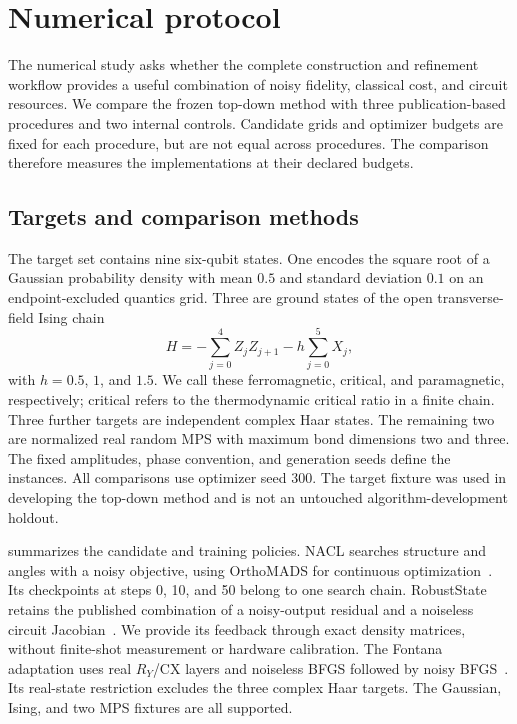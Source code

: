 \section{Numerical protocol}
\label{sec:protocol}

The numerical study asks whether the complete construction and refinement
workflow provides a useful combination of noisy fidelity, classical cost,
and circuit resources. We compare the frozen top-down method with three
publication-based procedures and two internal controls. Candidate grids and
optimizer budgets are fixed for each procedure, but are not equal across
procedures. The comparison therefore measures the implementations at their
declared budgets.

\subsection{Targets and comparison methods}

The target set contains nine six-qubit states. One encodes the square root
of a Gaussian probability density with mean $0.5$ and standard deviation
$0.1$ on an endpoint-excluded quantics grid. Three are ground states of the
open transverse-field Ising chain
\begin{equation}
 H=-\sum_{j=0}^{4}Z_jZ_{j+1}-h\sum_{j=0}^{5}X_j,
 \label{eq:tfim}
\end{equation}
with $h=0.5$, $1$, and $1.5$. We call these ferromagnetic, critical, and
paramagnetic, respectively; critical refers to the thermodynamic critical
ratio in a finite chain. Three further targets are independent complex Haar
states. The remaining two are normalized real random MPS with maximum bond
dimensions two and three. The fixed amplitudes, phase convention, and
generation seeds define the instances. All comparisons use optimizer seed
300. The target fixture was used in developing the top-down method and is
not an untouched algorithm-development holdout.

 summarizes the candidate and training policies.
NACL searches structure and angles with a noisy objective, using OrthoMADS
for continuous optimization~\cite{Cincio2021}. Its checkpoints at steps 0,
10, and 50 belong to one search chain. RobustState retains the published
combination of a noisy-output residual and a noiseless circuit
Jacobian~\cite{RobustState2024}. We provide its feedback through exact
density matrices, without finite-shot measurement or hardware calibration.
The Fontana adaptation uses real $R_Y$/CX layers and noiseless BFGS followed
by noisy BFGS~\cite{Fontana2021}. Its real-state restriction excludes the
three complex Haar targets. The Gaussian, Ising, and two MPS fixtures are
all supported.

